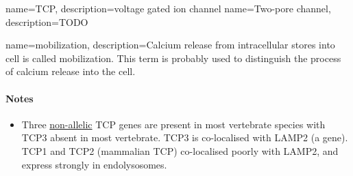 \documentclass[twocolumn]{article}
\begin{document}
    


{
    name=TCP,
    description={voltage gated ion channel}
}
{
    name=Two-pore channel,
    description={TODO}
}

{
    name=mobilization,
    description={Calcium release from intracellular stores into cell is called
        mobilization. This term is probably used to distinguish the process of
        calcium release into the cell.}
}

\paragraph{Notes}

\begin{itemize}[noitemsep,nolistsep]
    \item Three
        \href{http://biology.stackexchange.com/questions/10632/whats-a-non-allelic-gene}{non-allelic}
        TCP genes are present in most vertebrate species with TCP3 absent in
        most vertebrate. TCP3 is co-localised with LAMP2 (a gene). TCP1 and TCP2
        (mammalian TCP) co-localised poorly with LAMP2, and express strongly in
        endolysosomes.
\end{itemize}
\end{document}
